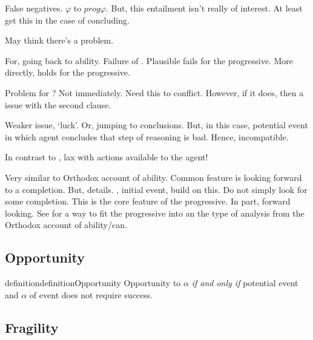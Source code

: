 \begin{note}
  False negatives.
  \(\varphi\) to \(prog \varphi\).
  But, this entailment isn't really of interest.
  At least get this in the case of concluding.
\end{note}

\begin{note}
  May think there's a problem.

  For, going back to ability.
  Failure of \BoyVS{}.
  Plausible fails for the progressive.
  More directly, \BoyVS{} holds for the progressive.

  Problem for ?
  Not immediately.
  Need this to conflict.
  However, if it does, then a issue with the second clause.

  Weaker issue, `luck'.
  Or, jumping to conclusions.
  But, in this case, potential event in which agent concludes that step of reasoning is bad.
  Hence, incompatible.
\end{note}

\begin{note}
  In contrast to \citeauthor{Boylan:2020aa}, lax with actions available to the agent!

  Very similar to Orthodox account of ability.
  Common feature is looking forward to a completion.
  But, details.
  \citeauthor{Landman:1992wh}, initial event, build on this.
  Do not simply look for some completion.
  This is the core feature of the progressive.
  In part, forward looking.
  See \textcite{Portner:1998um} for a way to fit the progressive into an the type of analysis from the Orthodox account of ability/can.
\end{note}

\subsection{Opportunity}
\label{sec:potential}


\begin{note}
  {
    \color{red}
    \begin{restatable}[Opportunity]{definition}{definitionOpportunity}
      Opportunity to \(\alpha\) \emph{if and only if} potential event and \(\alpha\) of event does not require success.
    \end{restatable}
  }
\end{note}

\subsection{Fragility}
\label{sec:fragility}

